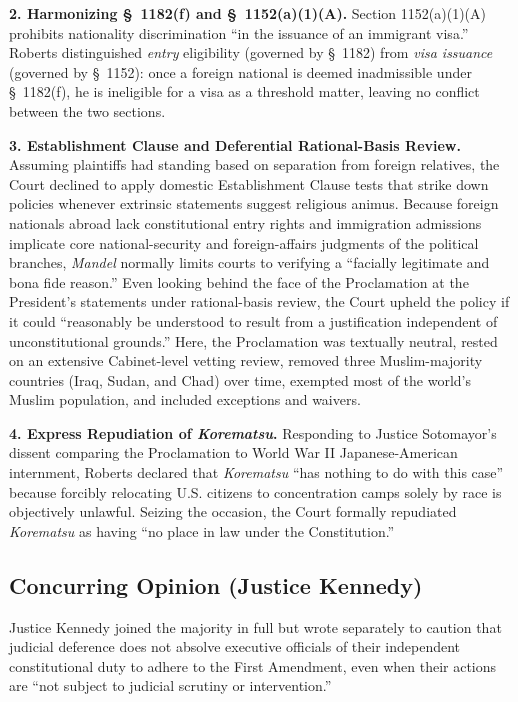 \documentclass[12pt]{article}
\begin{document}
\textbf{2. Harmonizing \S~1182(f) and \S~1152(a)(1)(A).} Section 1152(a)(1)(A) prohibits nationality discrimination ``in the issuance of an immigrant visa.'' Roberts distinguished \textit{entry} eligibility (governed by \S~1182) from \textit{visa issuance} (governed by \S~1152): once a foreign national is deemed inadmissible under \S~1182(f), he is ineligible for a visa as a threshold matter, leaving no conflict between the two sections.

\textbf{3. Establishment Clause and Deferential Rational-Basis Review.} Assuming plaintiffs had standing based on separation from foreign relatives, the Court declined to apply domestic Establishment Clause tests that strike down policies whenever extrinsic statements suggest religious animus. Because foreign nationals abroad lack constitutional entry rights and immigration admissions implicate core national-security and foreign-affairs judgments of the political branches, \textit{Mandel} normally limits courts to verifying a ``facially legitimate and bona fide reason.'' Even looking behind the face of the Proclamation at the President's statements under rational-basis review, the Court upheld the policy if it could ``reasonably be understood to result from a justification independent of unconstitutional grounds.'' Here, the Proclamation was textually neutral, rested on an extensive Cabinet-level vetting review, removed three Muslim-majority countries (Iraq, Sudan, and Chad) over time, exempted most of the world's Muslim population, and included exceptions and waivers.

\textbf{4. Express Repudiation of \textit{Korematsu}.} Responding to Justice Sotomayor's dissent comparing the Proclamation to World War II Japanese-American internment, Roberts declared that \textit{Korematsu} ``has nothing to do with this case'' because forcibly relocating U.S. citizens to concentration camps solely by race is objectively unlawful. Seizing the occasion, the Court formally repudiated \textit{Korematsu} as having ``no place in law under the Constitution.''

\subsection{Concurring Opinion (Justice Kennedy)}

Justice Kennedy joined the majority in full but wrote separately to caution that judicial deference does not absolve executive officials of their independent constitutional duty to adhere to the First Amendment, even when their actions are ``not subject to judicial scrutiny or intervention.''
\end{document}
